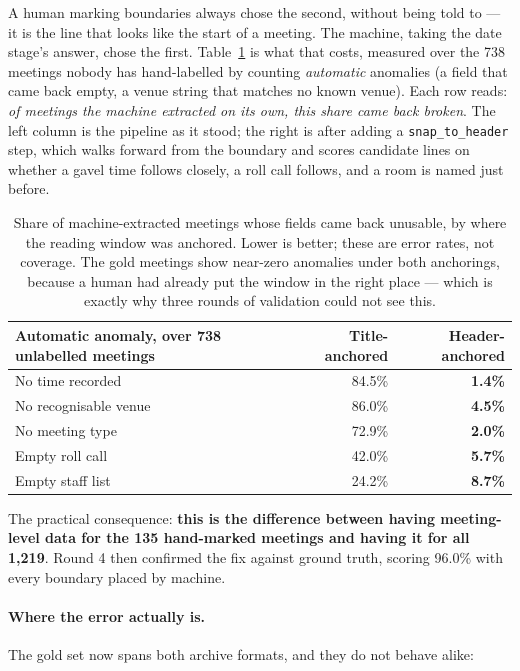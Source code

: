 \documentclass[11pt]{article}
\begin{document}
\noindent
A human marking boundaries always chose the second, without being told to --- it is the
line that looks like the start of a meeting. The machine, taking the date stage's answer,
chose the first. Table~\ref{tab:anchor} is what that costs, measured over the 738 meetings
nobody has hand-labelled by counting \emph{automatic} anomalies (a field that came back
empty, a venue string that matches no known venue). Each row reads: \emph{of meetings the
machine extracted on its own, this share came back broken}. The left column is the pipeline
as it stood; the right is after adding a \texttt{snap\_to\_header} step, which walks forward
from the boundary and scores candidate lines on whether a gavel time follows closely, a roll
call follows, and a room is named just before.

\begin{table}[h]
\centering
\begin{tabular}{lrr}
\toprule
Automatic anomaly, over 738 unlabelled meetings & Title-anchored & Header-anchored \\
\midrule
No time recorded              & 84.5\% & \textbf{1.4\%} \\
No recognisable venue         & 86.0\% & \textbf{4.5\%} \\
No meeting type               & 72.9\% & \textbf{2.0\%} \\
Empty roll call               & 42.0\% & \textbf{5.7\%} \\
Empty staff list              & 24.2\% & \textbf{8.7\%} \\
\bottomrule
\end{tabular}
\caption{Share of machine-extracted meetings whose fields came back unusable, by where the
reading window was anchored. Lower is better; these are error rates, not coverage. The gold
meetings show near-zero anomalies under both anchorings, because a human had already put the
window in the right place --- which is exactly why three rounds of validation could not see
this.}
\label{tab:anchor}
\end{table}

\noindent
The practical consequence: \textbf{this is the difference between having meeting-level data
for the 135 hand-marked meetings and having it for all 1{,}219}. Round 4 then confirmed the
fix against ground truth, scoring 96.0\% with every boundary placed by machine.

\paragraph{Where the error actually is.} The gold set now spans both archive formats, and
they do not behave alike:
\end{document}
